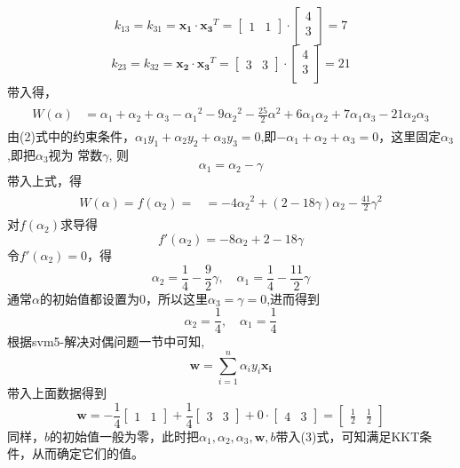 \documentclass[UTF8]{ctexart}
\begin{document}
$$k_{13}=k_{31}= \boldsymbol {x_1} \cdot \boldsymbol {x_3}^T=
\begin{bmatrix}
    1 & 1
\end{bmatrix}
\cdot
\begin{bmatrix}
    4 \\
    3 \\
\end{bmatrix}
=7$$
$$k_{23}=k_{32}= \boldsymbol {x_2} \cdot \boldsymbol {x_3}^T=
\begin{bmatrix}
    3 & 3
\end{bmatrix}
\cdot
\begin{bmatrix}
    4 \\
    3 \\
\end{bmatrix}
=21$$
带入得，
\begin{gather}
    \begin{aligned}
        W(\alpha) &=\alpha_1 + \alpha_2 + \alpha_3 - {\alpha_1}^2 - 9{\alpha_2}^2 - \frac{25}{2}{\alpha}^2 
        + 6\alpha_1\alpha_2 + 7\alpha_1\alpha_3 - 21\alpha_2\alpha_3
    \end{aligned}
\end{gather}
由(2)式中的约束条件，$\alpha_1y_1+\alpha_2y_2+\alpha_3y_3=0$,即$-\alpha_1+\alpha_2+\alpha_3=0$，这里固定$\alpha_3$,即把$\alpha_3$视为
常数$\gamma $, 则$$\alpha_1=\alpha_2-\gamma $$
带入上式，得
\begin{gather}
    \begin{aligned}
        W(\alpha) = f(\alpha_2)= &=-4{\alpha_2}^2+(2-18\gamma )\alpha_2 - \frac{41}{2}\gamma^2
    \end{aligned}
\end{gather}
对$f(\alpha_2)$求导得
$${f}'(\alpha_2)=-8\alpha_2 + 2-18\gamma  $$
令${f}'(\alpha_2)=0$，得
$$\alpha_2=\frac{1}{4}-\frac{9}{2}\gamma , \quad \alpha_1=\frac{1}{4}-\frac{11}{2}\gamma $$
通常$\alpha$的初始值都设置为0，所以这里$\alpha_3=\gamma =0$,进而得到
$$\alpha_2=\frac{1}{4},\quad \alpha_1=\frac{1}{4}$$
根据svm5-解决对偶问题一节中可知,$$\boldsymbol w = \sum_{i=1}^n \alpha_i y_i \boldsymbol {x_i}$$
带入上面数据得到$$\boldsymbol w = -\frac{1}{4}
\begin{bmatrix}
    1 & 1
\end{bmatrix} +
\frac{1}{4}
\begin{bmatrix}
    3 & 3
\end{bmatrix} +
0 \cdot
\begin{bmatrix}
    4 & 3
\end{bmatrix}
=
\begin{bmatrix}
    \frac{1}{2} & \frac{1}{2}
\end{bmatrix}
$$
同样，$b$的初始值一般为零，此时把$\alpha_1,\alpha_2,\alpha_3,\boldsymbol w,b$带入(3)式，可知满足KKT条件，从而确定它们的值。
\end{document}

